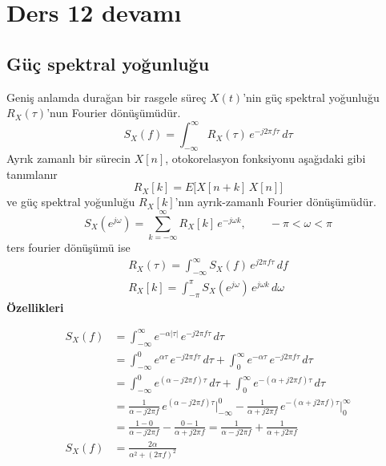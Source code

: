 \documentclass[11pt,a4paper]{article}
\begin{document}
\section{Ders 12 devamı}
\subsection{Güç spektral yoğunluğu}
Geniş anlamda durağan bir rasgele süreç $X(t)$'nin güç spektral yoğunluğu $R_X(\tau)$'nun Fourier dönüşümüdür.
\[ S_X(f)=\int_{-\infty}^{\infty}R_X(\tau)\,e^{-j2\pi f\tau}\,d\tau \]
Ayrık zamanlı bir sürecin $X[n]$, otokorelasyon fonksiyonu aşağıdaki gibi tanımlanır
\[ R_X[k]=E\big[X[n+k]\,X[n]\big] \]
ve güç spektral yoğunluğu $R_X[k]$'nın ayrık-zamanlı Fourier dönüşümüdür.
\[ S_X(e^{j\omega})=\sum_{k=-\infty}^{\infty}R_X[k]\,e^{-j\omega k},\qquad -\pi<\omega<\pi \]
ters fourier dönüşümü ise
\begin{gather*}
  R_X(\tau)=\int_{-\infty}^{\infty}S_X(f)\,e^{j2\pi f\tau}\,df\\
  R_X[k]=\int_{-\pi}^{\pi}S_X(e^{j\omega})\,e^{j\omega k}\,d\omega
\end{gather*}
\textbf{Özellikleri}
\begin{ornek}
  \begin{align*}
    S_X(f) &= \int_{-\infty}^{\infty}e^{-\alpha|\tau|}\,e^{-j2\pi f\tau}\,d\tau\\
    &= \int_{-\infty}^{0}e^{\alpha\tau}\,e^{-j2\pi f\tau}\,d\tau+\int_{0}^{\infty}e^{-\alpha\tau}\,e^{-j2\pi f\tau}\,d\tau\\
    &= \int_{-\infty}^{0}e^{(\alpha-j2\pi f)\tau}\,d\tau+\int_{0}^{\infty}e^{-(\alpha+j2\pi f)\tau}\,d\tau\\
    &= \frac{1}{\alpha-j2\pi f}\,e^{(\alpha-j2\pi f)\tau}\Big|_{-\infty}^{0}-\frac{1}{\alpha+j2\pi f}\,e^{-(\alpha+j2\pi f)\tau}\Big|_{0}^{\infty}\\
    &= \frac{1-0}{\alpha-j2\pi f}-\frac{0-1}{\alpha+j2\pi f}=\frac{1}{\alpha-j2\pi f}+\frac{1}{\alpha+j2\pi f}\\
    S_X(f) &= \frac{2\alpha}{\alpha^2+(2\pi f)^2}
  \end{align*}
\end{ornek}
\end{document}
